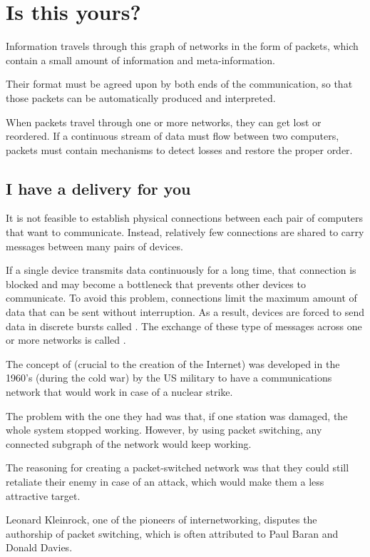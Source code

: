 
\chapter{Is this yours?}\label{sec:packets}

Information travels through this graph of networks in the form of packets, which contain a small amount of 
information and meta-information. 

Their format must be agreed upon by both ends of the communication, so that those packets can be automatically produced 
and interpreted.

When packets travel through one or more networks, they can get lost or reordered. If a continuous stream of data must 
flow between two computers, packets must contain mechanisms to detect losses and restore the proper order.

\section{I have a delivery for you}\label{sec:packets:lan_wan}

It is not feasible to establish physical connections between each pair of computers that want to communicate.
Instead, relatively few connections are shared to carry messages between many pairs of devices.

If a single device transmits data continuously for a long time, that connection is blocked and may become a bottleneck that 
prevents other devices to communicate. To avoid this problem, connections limit the maximum amount of data
that can be sent without interruption. As a result, devices are forced to send data in discrete bursts called 
. The exchange of these type of messages across one or more networks is called
.

\begin{remark}
The concept of  (crucial to the creation of the Internet)
was developed in the 1960's (during the cold war) by the US military
to have a communications network that would work in case of a nuclear strike.
 
The problem with the one they had was that, if one station was damaged, the whole system stopped working.
However, by using packet switching, any connected subgraph of the network would keep working.

The reasoning for creating a packet-switched network was that they could still retaliate their enemy in case of an attack, which would
make them a less attractive target.

Leonard Kleinrock, one of the pioneers of internetworking, disputes the authorship of packet switching,
which is often attributed to Paul Baran and Donald Davies.
\end{remark}

